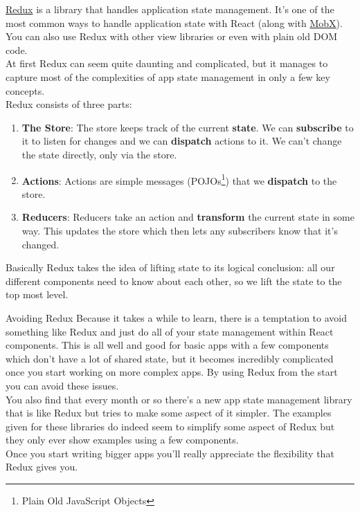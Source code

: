 \href{https://redux.js.org}{Redux} is a library that handles application state management. It's one of the most common ways to handle application state with React (along with \href{https://mobx.js.org}{MobX}). You can also use Redux with other view libraries or even with plain old DOM code.
\\

At first Redux can seem quite daunting and complicated, but it manages to capture most of the complexities of app state management in only a few key concepts.
\\

Redux consists of three parts:

\begin{enumerate}
    \item \textbf{The Store}: The store keeps track of the current \textbf{state}. We can \textbf{subscribe} to it to listen for changes and we can \textbf{dispatch} actions to it. We can't change the state directly, only via the store.

    \item \textbf{Actions}: Actions are simple messages (POJOs\footnote{Plain Old JavaScript Objects}) that we \textbf{dispatch} to the store.

    \item \textbf{Reducers}: Reducers take an action and \textbf{transform} the current state in some way. This updates the store which then lets any subscribers know that it's changed.
\end{enumerate}

Basically Redux takes the idea of lifting state to its logical conclusion: all our different components need to know about each other, so we lift the state to the top most level.


\pagebreak


\begin{infobox}{Avoiding Redux}
    Because it takes a while to learn, there is a temptation to avoid something like Redux and just do all of your state management within React components. This is all well and good for basic apps with a few components which don't have a lot of shared state, but it becomes incredibly complicated once you start working on more complex apps. By using Redux from the start you can avoid these issues.
    \\

    You also find that every month or so there's a new app state management library that is like Redux but tries to make some aspect of it simpler. The examples given for these libraries do indeed seem to simplify some aspect of Redux\textellipsis{} but they only ever show examples using a few components.
    \\

    Once you start writing bigger apps you'll really appreciate the flexibility that Redux gives you.
\end{infobox}

